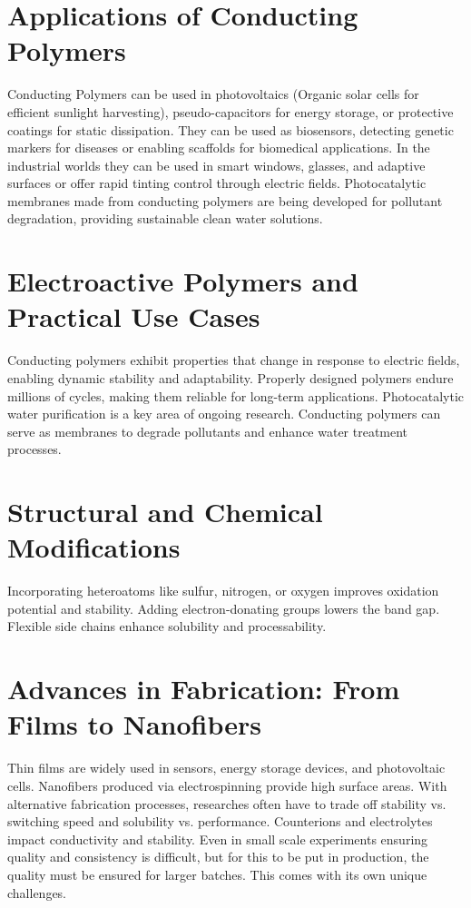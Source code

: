 \documentclass[12pt]{article}
\begin{document}
\section{Applications of Conducting Polymers}
    Conducting Polymers can be used in photovoltaics (Organic solar cells for efficient sunlight harvesting), pseudo-capacitors for energy storage, or protective coatings for static dissipation. They can be used as biosensors, detecting genetic markers for diseases or enabling scaffolds for biomedical applications. In the industrial worlds they can be used in smart windows, glasses, and adaptive surfaces or offer rapid tinting control through electric fields. Photocatalytic membranes made from conducting polymers are being developed for pollutant degradation, providing sustainable clean water solutions.

\section{Electroactive Polymers and Practical Use Cases}
    Conducting polymers exhibit properties that change in response to electric fields, enabling dynamic stability and adaptability. Properly designed polymers endure millions of cycles, making them reliable for long-term applications. Photocatalytic water purification is a key area of ongoing research. Conducting polymers can serve as membranes to degrade pollutants and enhance water treatment processes.


\section{Structural and Chemical Modifications}
    Incorporating heteroatoms like sulfur, nitrogen, or oxygen improves oxidation potential and stability. Adding electron-donating groups lowers the band gap. Flexible side chains enhance solubility and processability.

\section{Advances in Fabrication: From Films to Nanofibers}
    Thin films are widely used in sensors, energy storage devices, and photovoltaic cells. Nanofibers produced via electrospinning provide high surface areas. With alternative fabrication processes, researches often have to trade off stability vs. switching speed and solubility vs. performance. Counterions and electrolytes impact conductivity and stability. Even in small scale experiments ensuring quality and consistency is difficult, but for this to be put in production, the quality must be ensured for larger batches. This comes with its own unique challenges. 
\end{document}
